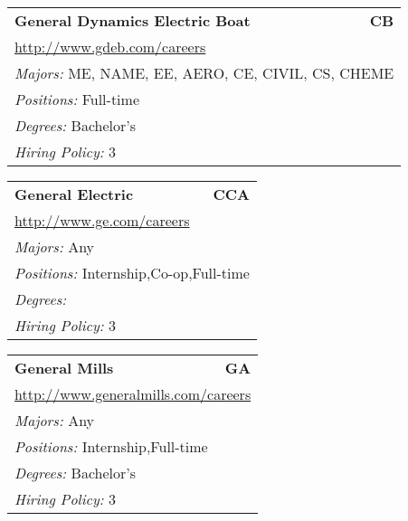 \documentclass[twoside]{article}
\begin{document}
\begin{center}
\begin{multicols}{3}
\begin{FlushLeft}
\begin{minipage}{\columnwidth}
\end{minipage}
 
\begin{minipage}{\columnwidth}\begin{tabularx}{.95\columnwidth}{Xr}
                 {\Large\bf General Dynamics Electric Boat} & {\Large\bf CB}\\
    \multicolumn{2}{p{.95\columnwidth}}{\url{http://www.gdeb.com/careers}}\\
    \multicolumn{2}{p{.95\columnwidth}}{\emph{Majors:} ME, NAME, EE, AERO, CE, CIVIL, CS, CHEME}\\
    \multicolumn{2}{p{.95\columnwidth}}{\emph{Positions:} Full-time}\\
    \multicolumn{2}{p{.95\columnwidth}}{\emph{Degrees:} Bachelor's}\\
    \multicolumn{2}{p{.95\columnwidth}}{\emph{Hiring Policy:} 3}\\
    \end{tabularx}
    
\end{minipage}
 
\begin{minipage}{\columnwidth}\begin{tabularx}{.95\columnwidth}{Xr}
                 {\Large\bf General Electric} & {\Large\bf CCA}\\
    \multicolumn{2}{p{.95\columnwidth}}{\url{http://www.ge.com/careers}}\\
    \multicolumn{2}{p{.95\columnwidth}}{\emph{Majors:} Any}\\
    \multicolumn{2}{p{.95\columnwidth}}{\emph{Positions:} Internship,Co-op,Full-time}\\
    \multicolumn{2}{p{.95\columnwidth}}{\emph{Degrees:} }\\
    \multicolumn{2}{p{.95\columnwidth}}{\emph{Hiring Policy:} 3}\\
    \end{tabularx}
    
\end{minipage}
 
\begin{minipage}{\columnwidth}\begin{tabularx}{.95\columnwidth}{Xr}
                 {\Large\bf General Mills} & {\Large\bf GA}\\
    \multicolumn{2}{p{.95\columnwidth}}{\url{http://www.generalmills.com/careers}}\\
    \multicolumn{2}{p{.95\columnwidth}}{\emph{Majors:} Any}\\
    \multicolumn{2}{p{.95\columnwidth}}{\emph{Positions:} Internship,Full-time}\\
    \multicolumn{2}{p{.95\columnwidth}}{\emph{Degrees:} Bachelor's}\\
    \multicolumn{2}{p{.95\columnwidth}}{\emph{Hiring Policy:} 3}\\
    \end{tabularx}
    

\end{minipage}
\end{FlushLeft}
\end{multicols}
\end{center}
\end{document}
